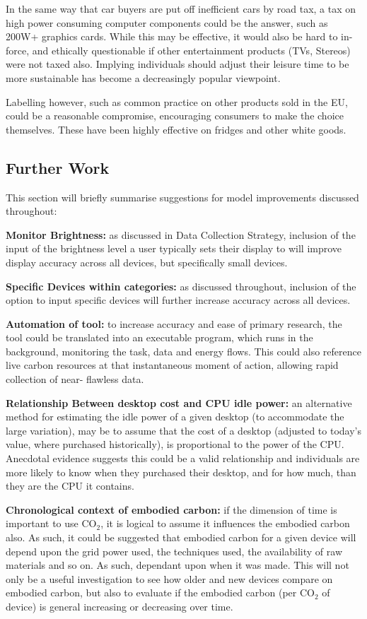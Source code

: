 \documentclass[conference]{IEEEtran}
\begin{document}
In the same way that car buyers are put off inefficient cars by road
tax, a tax on high power consuming computer components could be the
answer, such as 200W+ graphics cards. While this may be effective, it
would also be hard to in-force, and ethically questionable if other
entertainment products (TVs, Stereos) were not taxed also. Implying
individuals should adjust their leisure time to be more sustainable
has become a decreasingly popular viewpoint.

Labelling however, such as common practice on other products sold in
the EU, could be a reasonable compromise, encouraging consumers to
make the choice themselves. These have been highly effective on
fridges and other white goods.


\subsection{Further Work}

This section will briefly summarise suggestions for model improvements
discussed throughout:

{\textbf{Monitor Brightness:}} as discussed in Data Collection Strategy,
inclusion of the input of the brightness level a user typically sets
their display to will improve display accuracy across all devices, but
specifically small devices.

{\textbf{Specific Devices within categories:}} as discussed throughout,
inclusion of the option to input specific devices will further
increase accuracy across all devices.

{\textbf{Automation of tool:}} to increase accuracy and ease of primary
research, the tool could be translated into an executable program,
which runs in the background, monitoring the task, data and energy
flows. This could also reference live carbon resources at that
instantaneous moment of action, allowing rapid collection of near-
flawless data.

{\textbf{Relationship Between desktop cost and CPU idle power:}} an
alternative method for estimating the idle power of a given desktop
(to accommodate the large variation), may be to assume that the cost
of a desktop (adjusted to today’s value, where purchased
historically), is proportional to the power of the CPU. Anecdotal
evidence suggests this could be a valid relationship and individuals
are more likely to know when they purchased their desktop, and for how
much, than they are the CPU it contains.

{\textbf{Chronological context of embodied carbon:}} if the dimension
of time is important to use CO$_2$, it is logical to assume it influences
the embodied carbon also. As such, it could be suggested that embodied
carbon for a given device will depend upon the grid power used, the
techniques used, the availability of raw materials and so on. As such,
dependant upon when it was made. This will not only be a useful
investigation to see how older and new devices compare on embodied
carbon, but also to evaluate if the embodied carbon (per CO$_2$ of
device) is general increasing or decreasing over time.
\end{document}
